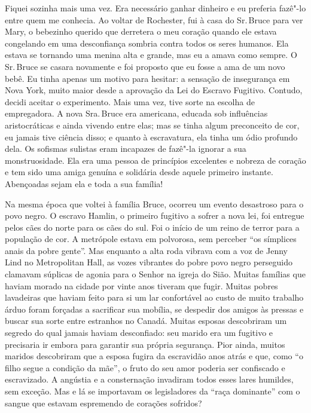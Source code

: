 Fiquei sozinha mais uma vez. Era
necessário ganhar dinheiro e eu preferia fazê"-lo entre quem me conhecia.
Ao voltar de Rochester, fui à casa do Sr.\,Bruce para ver Mary, o
bebezinho querido que derretera o meu coração quando ele estava
congelando em uma desconfiança sombria contra todos os seres humanos.
Ela estava se tornando uma menina alta e grande, mas eu a amava como
sempre. O Sr.\,Bruce se casara novamente e foi proposto que eu fosse a
ama de um novo bebê. Eu tinha apenas um motivo para hesitar: a sensação
de insegurança em Nova York, muito maior desde a aprovação da Lei do
Escravo Fugitivo. Contudo, decidi aceitar o experimento. Mais uma vez,
tive sorte na escolha de empregadora. A nova Sra.\,Bruce era americana,
educada sob influências aristocráticas e ainda vivendo entre elas; mas
se tinha algum preconceito de cor, eu jamais tive ciência disso; e
quanto à escravatura, ela tinha um ódio profundo dela. Os sofismas
sulistas eram incapazes de fazê"-la ignorar a sua monstruosidade. Ela era
uma pessoa de princípios excelentes e nobreza de coração e tem sido uma
amiga genuína e solidária desde aquele primeiro instante. Abençoadas
sejam ela e toda a sua família!

Na mesma época que voltei à família
Bruce, ocorreu um evento desastroso para o povo negro. O escravo Hamlin,
o primeiro fugitivo a sofrer a nova lei, foi entregue pelos cães do
norte para os cães do sul. Foi o início de um reino de terror para a
população de cor. A metrópole estava em polvorosa, sem perceber ``os
símplices anais da pobre gente''. Mas enquanto a alta roda vibrava com a
voz de Jenny Lind no Metropolitan Hall, as vozes vibrantes do pobre povo
negro perseguido clamavam súplicas de agonia para o Senhor na igreja do
Sião. Muitas famílias que haviam morado na cidade por vinte anos tiveram
que fugir. Muitas pobres lavadeiras que haviam feito para si um lar
confortável ao custo de muito trabalho árduo foram forçadas a sacrificar
sua mobília, se despedir dos amigos às pressas e buscar sua sorte entre
estranhos no Canadá. Muitas esposas descobriram um segredo do qual
jamais haviam desconfiado: seu marido era um fugitivo e precisaria ir
embora para garantir sua própria segurança. Pior ainda, muitos maridos
descobriram que a esposa fugira da escravidão anos atrás e que, como ``o
filho segue a condição da mãe'', o fruto do seu amor poderia ser
confiscado e escravizado. A angústia e a consternação invadiram todos
esses lares humildes, sem exceção. Mas e lá se importavam os
legisladores da ``raça dominante'' com o sangue que estavam espremendo
de corações sofridos?

